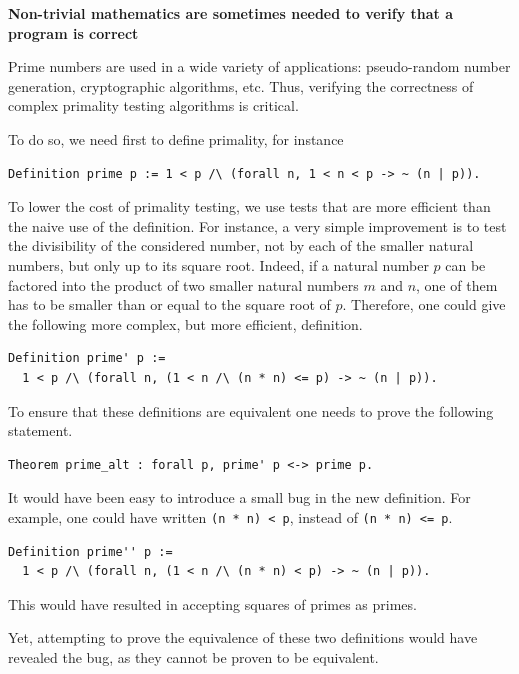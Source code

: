 \begin{framed}
\vspace*{-0.5cm}
\begin{center} {\bf \Large Non-trivial mathematics are sometimes
needed to verify that a program is correct}
\end{center}

Prime numbers are used in a wide variety of applications:
pseudo-random number generation, cryptographic algorithms, etc.  Thus,
verifying the correctness of complex primality testing algorithms is
critical.

To do so, we need first to define primality, for instance
\begin{verbatim}
Definition prime p := 1 < p /\ (forall n, 1 < n < p -> ~ (n | p)).
\end{verbatim}

To lower the cost of primality testing, we use tests that are more
efficient than the naive use of the definition.  For instance, a very
simple improvement is to test the divisibility of the considered
number, not by each of the smaller natural numbers, but only up to its
square root.  Indeed, if a natural number $p$ can be factored into the
product of two smaller natural numbers $m$ and $n$, one of them has to
be smaller than or equal to the square root of $p$.  Therefore, one
could give the following more complex, but more efficient, definition.

\begin{verbatim}
Definition prime' p :=
  1 < p /\ (forall n, (1 < n /\ (n * n) <= p) -> ~ (n | p)).
\end{verbatim}

To ensure that these definitions are equivalent one needs to prove
the following statement.

\begin{verbatim}
Theorem prime_alt : forall p, prime' p <-> prime p.
\end{verbatim}

It would have been easy to introduce a small bug
in the new definition.  For example, one could have written
\verb!(n * n) < p!, instead of \verb!(n * n) <= p!.

\begin{verbatim}
Definition prime'' p :=
  1 < p /\ (forall n, (1 < n /\ (n * n) < p) -> ~ (n | p)).
\end{verbatim}
This would have resulted in accepting squares of primes as primes.

Yet, attempting to prove the equivalence of these two definitions would
have revealed the bug, as they cannot be proven to be equivalent.
\end{framed}

